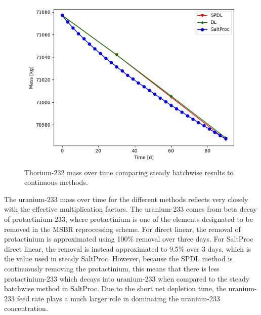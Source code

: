 \begin{figure}[H]
  \centering
  \includegraphics[scale=0.7]{images/soln-1-2-th232.png}
  \caption{Thorium-232 mass over time comparing steady batchwise results to continuous methods.}
   \label{fig:steady-compare-th232}
\end{figure}

The uranium-233 mass over time for the different methods reflects very closely with the effective multiplication factors. The uranium-233 comes from beta decay of protactinium-233, where protactinium is one of the elements designated to be removed in the MSBR reprocessing scheme. For direct linear, the removal of protactinium is approximated using 100\% removal over three days. For SaltProc direct linear, the removal is instead approximated to 9.5\% over 3 days, which is the value used in steady SaltProc. However, because the SPDL method is continuously removing the protactinium, this means that there is less protactinium-233 which decays into uranium-233 when compared to the steady batchwise method in SaltProc. Due to the short net depletion time, the uranium-233 feed rate plays a much larger role in dominating the uranium-233 concentration.

